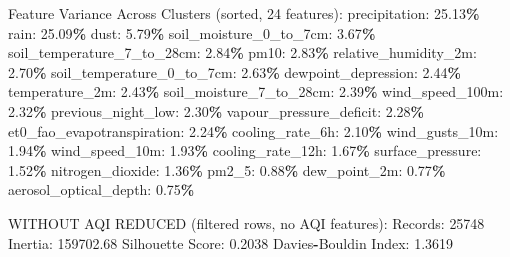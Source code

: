 \documentclass[
  letterpaper,
  DIV=11,
  numbers=noendperiod]{scrartcl}
\newenvironment{Shaded}{\begin{snugshade}}{\end{snugshade}}
\newcommand{\BuiltInTok}[1]{#1}
\newcommand{\DecValTok}[1]{\textcolor[rgb]{0.00,0.00,0.81}{#1}}
\newcommand{\FloatTok}[1]{\textcolor[rgb]{0.00,0.00,0.81}{#1}}
\newcommand{\NormalTok}[1]{#1}
\newcommand{\OperatorTok}[1]{\textcolor[rgb]{0.81,0.36,0.00}{\textbf{#1}}}
\begin{document}
\begin{Shaded}
\begin{Highlighting}[]
\NormalTok{  Feature Variance Across Clusters (}\BuiltInTok{sorted}\NormalTok{, }\DecValTok{24}\NormalTok{ features):}
\NormalTok{    precipitation: }\FloatTok{25.13}\OperatorTok{\%}
\NormalTok{    rain: }\FloatTok{25.09}\OperatorTok{\%}
\NormalTok{    dust: }\FloatTok{5.79}\OperatorTok{\%}
\NormalTok{    soil\_moisture\_0\_to\_7cm: }\FloatTok{3.67}\OperatorTok{\%}
\NormalTok{    soil\_temperature\_7\_to\_28cm: }\FloatTok{2.84}\OperatorTok{\%}
\NormalTok{    pm10: }\FloatTok{2.83}\OperatorTok{\%}
\NormalTok{    relative\_humidity\_2m: }\FloatTok{2.70}\OperatorTok{\%}
\NormalTok{    soil\_temperature\_0\_to\_7cm: }\FloatTok{2.63}\OperatorTok{\%}
\NormalTok{    dewpoint\_depression: }\FloatTok{2.44}\OperatorTok{\%}
\NormalTok{    temperature\_2m: }\FloatTok{2.43}\OperatorTok{\%}
\NormalTok{    soil\_moisture\_7\_to\_28cm: }\FloatTok{2.39}\OperatorTok{\%}
\NormalTok{    wind\_speed\_100m: }\FloatTok{2.32}\OperatorTok{\%}
\NormalTok{    previous\_night\_low: }\FloatTok{2.30}\OperatorTok{\%}
\NormalTok{    vapour\_pressure\_deficit: }\FloatTok{2.28}\OperatorTok{\%}
\NormalTok{    et0\_fao\_evapotranspiration: }\FloatTok{2.24}\OperatorTok{\%}
\NormalTok{    cooling\_rate\_6h: }\FloatTok{2.10}\OperatorTok{\%}
\NormalTok{    wind\_gusts\_10m: }\FloatTok{1.94}\OperatorTok{\%}
\NormalTok{    wind\_speed\_10m: }\FloatTok{1.93}\OperatorTok{\%}
\NormalTok{    cooling\_rate\_12h: }\FloatTok{1.67}\OperatorTok{\%}
\NormalTok{    surface\_pressure: }\FloatTok{1.52}\OperatorTok{\%}
\NormalTok{    nitrogen\_dioxide: }\FloatTok{1.36}\OperatorTok{\%}
\NormalTok{    pm2\_5: }\FloatTok{0.88}\OperatorTok{\%}
\NormalTok{    dew\_point\_2m: }\FloatTok{0.77}\OperatorTok{\%}
\NormalTok{    aerosol\_optical\_depth: }\FloatTok{0.75}\OperatorTok{\%}

\NormalTok{WITHOUT AQI REDUCED (filtered rows, no AQI features):}
\NormalTok{  Records: }\DecValTok{25748}
\NormalTok{  Inertia: }\FloatTok{159702.68}
\NormalTok{  Silhouette Score: }\FloatTok{0.2038}
\NormalTok{  Davies}\OperatorTok{{-}}\NormalTok{Bouldin Index: }\FloatTok{1.3619}


\end{Highlighting}
\end{Shaded}
\end{document}
